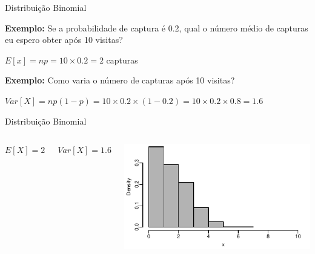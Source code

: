 \documentclass{beamer}\usepackage[]{graphicx}\usepackage[]{color}
\makeatletter
\def\maxwidth{ %
  \ifdim\Gin@nat@width>\linewidth
    \linewidth
  \else
    \Gin@nat@width
  \fi
}
\newenvironment{knitrout}{}{} %
\renewenvironment{knitrout}{\setlength{\topsep}{0mm}}{}
\makeatother
\begin{document}
\begin{frame}{Distribuição Binomial}



\textbf{Exemplo:} Se a probabilidade de captura é 0.2, qual o número médio de capturas eu espero obter após 10 visitas?

\begin{center}
$E[x] = np = 10 \times 0.2 = 2$ capturas
\end{center}

\textbf{Exemplo:} Como varia o número de capturas após 10 visitas?

\begin{center}
$Var[X] = np(1 - p) = 10 \times 0.2 \times (1 - 0.2) = 10 \times 0.2 \times 0.8 = 1.6$
\end{center}

\end{frame} 

\begin{frame}[fragile]{Distribuição Binomial}

\begin{columns}[c]


$E[X] = 2$

\vfill

$Var[X] = 1.6$



\begin{knitrout}\tiny
{}\color{fgcolor}
\includegraphics[width=\maxwidth]{figure/binom_plot-1} 

\end{knitrout}

\end{columns}



\end{frame} 
\end{document}
